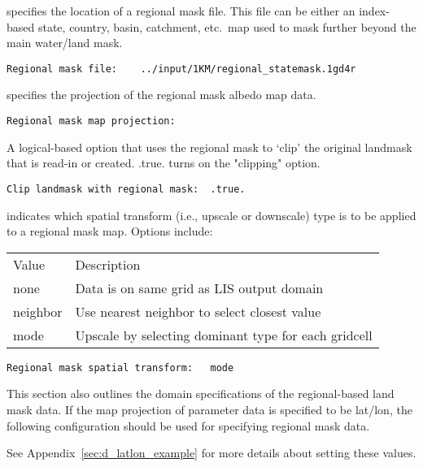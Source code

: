  
  specifies the location of a regional
 mask file.
 This file can be either an index-based state, country, basin,
 catchment, etc.\ map used to mask further beyond the main
 water/land mask.
 

 \begin{Verbatim}[frame=single]
Regional mask file:    ../input/1KM/regional_statemask.1gd4r
 \end{Verbatim}

 
  specifies the projection of the
 regional mask albedo map data.
 

 \begin{Verbatim}[frame=single]
Regional mask map projection:
 \end{Verbatim}

 
  A logical-based option 
  that uses the regional mask to `clip' the original landmask that is
  read-in or created.
  .true. turns on the "clipping" option.
 

 \begin{Verbatim}[frame=single]
Clip landmask with regional mask:  .true.
 \end{Verbatim}

 
  indicates which spatial
 transform (i.e., upscale or downscale) type is to be applied
 to a regional mask map.  Options include:

 \begin{tabular}{ll}
 Value     & Description                                          \\
 none      &  Data is on same grid as LIS output domain           \\
 neighbor  &  Use nearest neighbor to select closest value        \\
 mode      &  Upscale by selecting dominant type for each gridcell \\
 \end{tabular}
 

 \begin{Verbatim}[frame=single]
Regional mask spatial transform:   mode
 \end{Verbatim}

 
 This section also outlines the domain specifications of the
 regional-based land mask data.
 If the map projection of parameter data is specified to be lat/lon,
 the following configuration should be used for specifying regional
 mask data.
 
 See Appendix~\ref{sec:d_latlon_example} for more details about
 setting these values.
 

